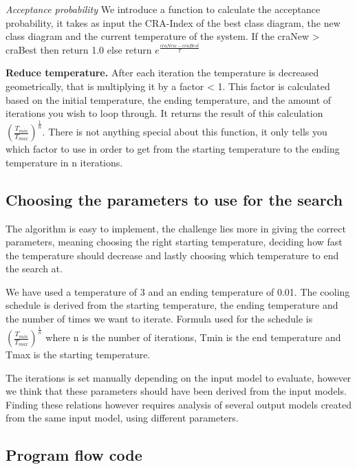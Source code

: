 \documentclass[a4paper]{article}
\begin{document}
\textit{Acceptance probability}
We introduce a function to calculate the acceptance probability, it takes as input the CRA-Index of the best class diagram, the new class diagram and the current temperature of the system.
If the craNew > craBest then return 1.0 else return $e^\frac{craNew - craBest}{T}$

\textbf{Reduce temperature.}
After each iteration the temperature is decreased geometrically, that is multiplying it by a factor < 1.
This factor is calculated based on the initial temperature, the ending temperature, and the amount of iterations you wish to loop through.
It returns the result of this calculation $(\frac{T_{min}}{T_{max}})^\frac{1}{n}$.
There is not anything special about this function, it only tells you which factor to use in order to get from the starting temperature to the ending temperature in n
iterations.

\subsection{Choosing the parameters to use for the search}

The algorithm is easy to implement, the challenge lies more in giving the correct parameters, meaning choosing the right starting temperature, deciding how fast the temperature should decrease and lastly choosing which temperature to end the search at.

We have used a temperature of 3 and an ending temperature of 0.01.
The cooling schedule is derived from the starting temperature, the ending temperature and the number of times we want to iterate.
Formula used for the schedule is $(\frac{T_{min}}{T_{max}})^\frac{1}{n}$ where n is the number of iterations, Tmin is the end temperature and Tmax is the starting temperature.

The iterations is set manually depending on the input model to evaluate, however we think that these parameters should have been derived from the input models.
Finding these relations however requires analysis of several output models created from the same input model, using different parameters.


\subsection{Program flow code}
\end{document}
